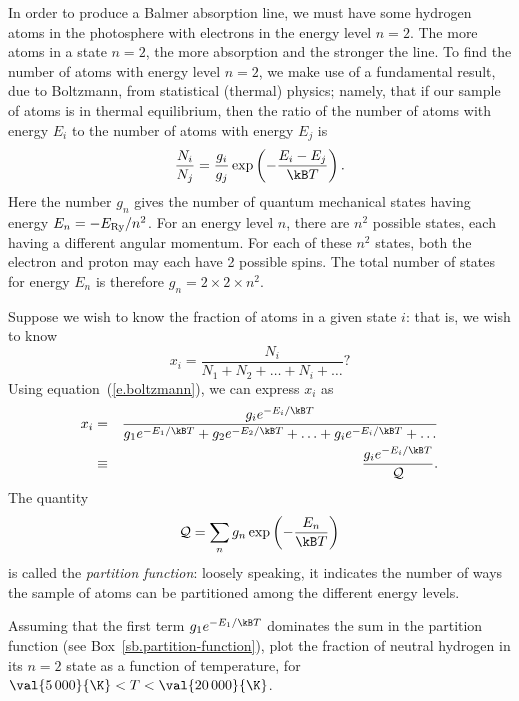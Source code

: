 In order to produce a Balmer absorption line, we must have some hydrogen atoms in the photosphere with electrons in the energy level $n=2$. The more atoms in a state $n=2$, the more absorption and the stronger the line. To find the number of atoms with energy level $n=2$, we make use of a fundamental result, due to Boltzmann, from statistical (thermal) physics; namely, that if our sample of atoms is in thermal equilibrium, then the ratio of the number of atoms with energy $E_{i}$ to the number of atoms with energy $E_{j}$ is
\begin{equation}\label{e.boltzmann}
\frac{N_{i}}{N_{j}} = \frac{g_{i}}{g_{j}} 
\exp\left(-\frac{E_{i}-E_{j}}{\kB T}\right).
\end{equation}
Here the number $g_{n}$ gives the number of quantum mechanical states having energy $E_{n} = -E_{\mathrm{Ry}}/n^{2}$. For an energy level $n$, there are $n^{2}$ possible states, each having a different angular momentum. For each of these $n^{2}$ states, both the electron and proton may each have 2 possible spins. The total number of states for energy $E_{n}$ is therefore $g_{n} = 2\times2\times n^{2}$.

Suppose we wish to know the fraction of atoms in a given state $i$: that is, we wish to know
\[	x_{i} = \frac{N_{i}}{N_{1}+N_{2}+\ldots+N_{i}+\ldots} ? \]
Using equation~(\ref{e.boltzmann}), we can express $x_{i}$ as 
\begin{eqnarray}
  x_{i} &=& \frac{g_{i}e^{-E_{i}/\kB T}}{g_{1}e^{-E_{1}/\kB T}+g_{2}e^{-E_{2}/\kB T}+\ldots+g_{i}e^{-E_{i}/\kB T}+\ldots} \nonumber\\
        &\equiv& \frac{g_{i}e^{-E_{i}/\kB T}}{\pfcn}.
\end{eqnarray}
The quantity 
\begin{equation}\label{e.partition-function}
	\pfcn = \sum_{n} g_{n}\exp\left(-\frac{E_{n}}{\kB T}\right)
\end{equation}
is called the \emph{partition function}: loosely speaking, it indicates the number of ways the sample of atoms can be partitioned among the different energy levels.

\begin{exercisebox}
Assuming that the first term $g_{1}e^{-E_{1}/\kB T}$ dominates the sum in the partition function (see Box~\ref{sb.partition-function}), plot the fraction of neutral hydrogen in its $n=2$ state as a function of temperature, for $\val{5\,000}{\K} < T < \val{20\,000}{\K}$.
\end{exercisebox}

